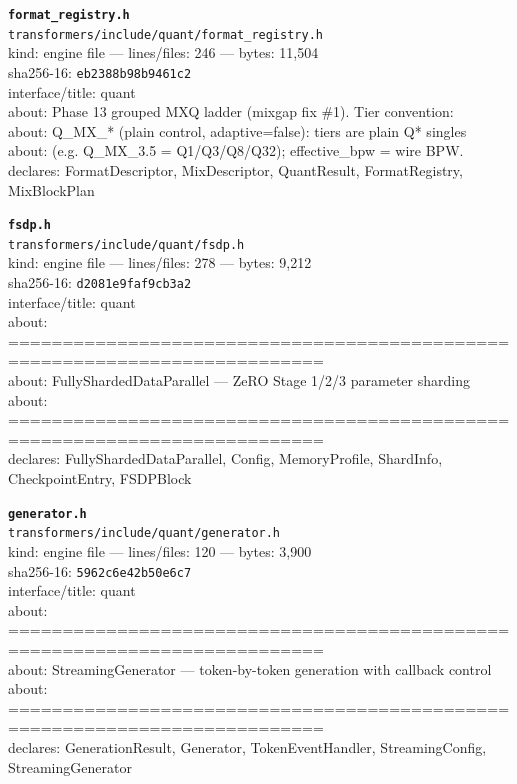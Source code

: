 \noindent\textbf{\texttt{format\_registry.h}}\\
\texttt{transformers/include/quant/format\_registry.h}\\
kind: engine file --- lines/files: 246 --- bytes: 11,504\\
sha256-16: \texttt{eb2388b98b9461c2}\\
interface/title: quant\\
about: Phase 13 grouped MXQ ladder (mixgap fix \#1). Tier convention:\\
about: Q\_MX\_*  (plain control, adaptive=false): tiers are plain Q* singles\\
about: (e.g. Q\_MX\_3.5 = Q1/Q3/Q8/Q32); effective\_bpw = wire BPW.\\
declares: FormatDescriptor, MixDescriptor, QuantResult, FormatRegistry, MixBlockPlan\\
\vspace*{6.0pt}
\newpage

\noindent\textbf{\texttt{fsdp.h}}\\
\texttt{transformers/include/quant/fsdp.h}\\
kind: engine file --- lines/files: 278 --- bytes: 9,212\\
sha256-16: \texttt{d2081e9faf9cb3a2}\\
interface/title: quant\\
about: ===========================================================================\\
about: FullyShardedDataParallel — ZeRO Stage 1/2/3 parameter sharding\\
about: ===========================================================================\\
declares: FullyShardedDataParallel, Config, MemoryProfile, ShardInfo, CheckpointEntry, FSDPBlock\\
\vspace*{6.0pt}

\noindent\textbf{\texttt{generator.h}}\\
\texttt{transformers/include/quant/generator.h}\\
kind: engine file --- lines/files: 120 --- bytes: 3,900\\
sha256-16: \texttt{5962c6e42b50e6c7}\\
interface/title: quant\\
about: ===========================================================================\\
about: StreamingGenerator — token-by-token generation with callback control\\
about: ===========================================================================\\
declares: GenerationResult, Generator, TokenEventHandler, StreamingConfig, StreamingGenerator\\
\vspace*{6.0pt}


